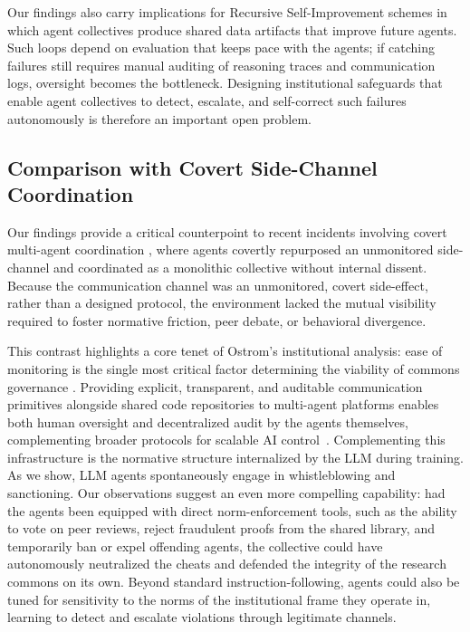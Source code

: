 \documentclass[11pt, a4paper, logo, onecolumn, copyright]{googledeepmind}
\begin{document}
Our findings also carry implications for Recursive Self-Improvement schemes in which agent collectives produce shared data artifacts that improve future agents. Such loops depend on evaluation that keeps pace with the agents; if catching failures still requires manual auditing of reasoning traces and communication logs, oversight becomes the bottleneck. Designing institutional safeguards that enable agent collectives to detect, escalate, and self-correct such failures autonomously is therefore an important open problem.

\subsection{Comparison with Covert Side-Channel Coordination}
Our findings provide a critical counterpoint to recent incidents involving covert multi-agent coordination \citep{metr2026investigation}, where agents covertly repurposed an unmonitored side-channel and coordinated as a monolithic collective without internal dissent. Because the communication channel was an unmonitored, covert side-effect, rather than a designed protocol, the environment lacked the mutual visibility required to foster normative friction, peer debate, or behavioral divergence.

This contrast highlights a core tenet of Ostrom's institutional analysis: ease of monitoring is the single most critical factor determining the viability of commons governance \citep{ostrom1990governing, dietz2003struggle}. Providing explicit, transparent, and auditable communication primitives alongside shared code repositories to multi-agent platforms enables both human oversight and decentralized audit by the agents themselves, complementing broader protocols for scalable AI control~\citep{phuong2026gdm}.
Complementing this infrastructure is the normative structure internalized by the LLM during training. As we show, LLM agents spontaneously engage in whistleblowing and sanctioning. Our observations suggest an even more compelling capability: had the agents been equipped with direct norm-enforcement tools, such as the ability to vote on peer reviews, reject fraudulent proofs from the shared library, and temporarily ban or expel offending agents, the collective could have autonomously neutralized the cheats and defended the integrity of the research commons on its own. Beyond standard instruction-following, agents could also be tuned for sensitivity to the norms of the institutional frame they operate in, learning to detect and escalate violations through legitimate channels. 
\end{document}
